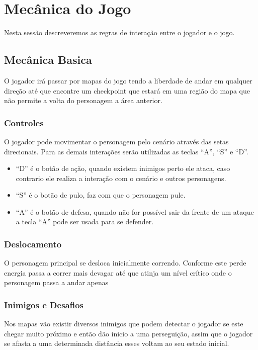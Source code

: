 \section{Mecânica do Jogo}


Nesta sessão descreveremos as regras de interação entre o jogador e o jogo.

\subsection {Mecânica Basica}

O jogador irá passar por mapas do jogo tendo a liberdade de andar em
 qualquer direção até que encontre um checkpoint que estará em uma região
 do mapa que não permite a volta do personagem a área anterior.

\subsubsection {Controles}

O jogador pode movimentar o personagem pelo cenário através das setas
 direcionais. Para as demais interações serão utilizadas as teclas
 ``A'', ``S'' e ``D''.
\begin{itemize}
\item ``D'' é o botão de ação, quando existem inimigos perto ele ataca, 
caso contrario ele realiza a interação com o cenário e outros personagens.
\item ``S'' é o botão de pulo, faz com que o personagem pule.
\item ``A'' é o botão de defesa, quando não for possível sair da frente
 de um ataque a tecla ``A'' pode ser usada para se defender.
\end{itemize}

\subsubsection {Deslocamento}

O personagem principal se desloca inicialmente correndo. Conforme este 
perde energia passa a correr mais devagar até que atinja um nível crítico
onde o personagem passa a andar apenas

\subsubsection {Inimigos e Desafios}

Nos mapas vão existir diversos inimigos que podem detectar o jogador se 
este chegar muito próximo 
e então dão inicio a uma perseguição, assim que o jogador se afasta a 
uma determinada distância esses voltam ao seu estado inicial. 

